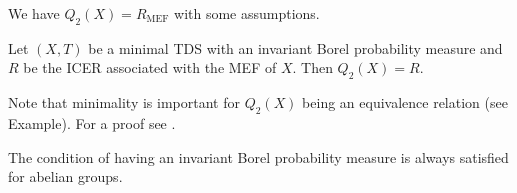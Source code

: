 \begin{frame}
  We have $Q_2(X) = R_{\text{MEF}}$ with some assumptions.
\begin{theorem}
  Let $(X, T)$ be a minimal TDS with an invariant Borel probability measure
  and $R$ be the ICER associated with the MEF of $X$.
  Then $Q_2(X) = R$.
\end{theorem}
  Note that minimality is important for $Q_2(X)$ being an equivalence relation (see Example).
  For a proof see \cite[p.130, Thm. 8.]{Auslaner}.

  The condition of having an invariant Borel probability measure is always satisfied for abelian groups.
\end{frame}